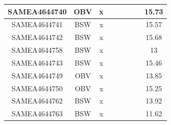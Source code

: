 \documentclass[../main.tex]{subfiles}
\begin{document}
\begin{flushleft}
\begin{footnotesize}
\begin{longtable}{|c|c|c|c|c|c|c|}
    \hline
    SAMEA4644740  & OBV   & x                                                            & ~          & ~                                                                           & ~                                                                 & 15.73     \\ 
    \hline
    SAMEA4644741  & BSW   & x                                                            & ~          & ~                                                                           & ~                                                                 & 15.57     \\ 
    \hline
    SAMEA4644742  & BSW   & x                                                            & ~          & ~                                                                           & ~                                                                 & 15.68     \\ 
    \hline
    SAMEA4644758  & BSW   & x                                                            & ~          & ~                                                                           & ~                                                                 & 13        \\ 
    \hline
    SAMEA4644743  & BSW   & x                                                            & ~          & ~                                                                           & ~                                                                 & 15.46     \\ 
    \hline
    SAMEA4644749  & OBV   & x                                                            & ~          & ~                                                                           & ~                                                                 & 13.85     \\ 
    \hline
    SAMEA4644750  & OBV   & x                                                            & ~          & ~                                                                           & ~                                                                 & 15.25     \\ 
    \hline
    SAMEA4644762  & BSW   & x                                                            & ~          & ~                                                                           & ~                                                                 & 13.92     \\ 
    \hline
    SAMEA4644763  & BSW   & x                                                            & ~          & ~                                                                           & ~                                                                 & 11.62     \\ 

\end{longtable}
\end{footnotesize}
\end{flushleft}
\end{document}
